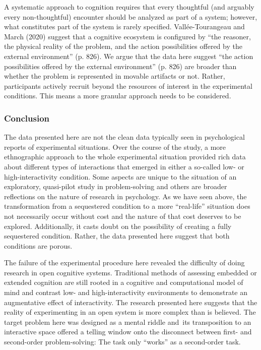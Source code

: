 \documentclass{article}
\begin{document}
A systematic approach to cognition requires that every thoughtful (and arguably every non-thoughtful) encounter should be analyzed as part of a system; however, what constitutes part of the system is rarely specified. Vallée-Tourangeau and March (2020) suggest that a cognitive ecosystem is configured by “the reasoner, the physical reality of the problem, and the action possibilities offered by the external environment” (p. 826). We argue that the data here suggest “the action possibilities offered by the external environment” (p. 826) are broader than whether the problem is represented in movable artifacts or not. Rather, participants actively recruit beyond the resources of interest in the experimental conditions. This means a more granular approach needs to be considered. 

\subsubsection{Conclusion}

The data presented here are not the clean data typically seen in psychological reports of experimental situations. Over the course of the study, a more ethnographic approach to the whole experimental situation provided rich data about different types of interactions that emerged in either a so-called low- or high-interactivity condition. Some aspects are unique to the situation of an exploratory, quasi-pilot study in problem-solving and others are broader reflections on the nature of research in psychology. As we have seen above, the transformation from a sequestered condition to a more “real-life” situation does not necessarily occur without cost and the nature of that cost deserves to be explored. Additionally, it casts doubt on the possibility of creating a fully sequestered condition. Rather, the data presented here suggest that both conditions are porous. 

The failure of the experimental procedure here revealed the difficulty of doing research in open cognitive systems. Traditional methods of assessing embedded or extended cognition are still rooted in a cognitive and computational model of mind and contrast low- and high-interactivity environments to demonstrate an augmentative effect of interactivity. The research presented here suggests that the reality of experimenting in an open system is more complex than is believed. The target problem here was designed as a mental riddle and its transposition to an interactive space offered a telling window onto the disconnect between first- and second-order problem-solving: The task only “works” as a second-order task.
\end{document}
